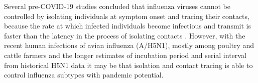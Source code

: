 \documentclass{article}
\begin{document}
Several pre-COVID-19 studies concluded that influenza viruses cannot be controlled by isolating individuals at symptom onset and tracing their contacts, because the rate at which infected individuals become infectious and transmit is faster than the latency in the process of isolating contacts \citep{fraserFactorsThatMake2004, klinkenbergEffectivenessContactTracing2006}. However, with the recent human infections of avian influenza (A/H5N1), mostly among poultry and cattle farmers \citep{gargHighlyPathogenicAvian2025} and the longer estimates of incubation period and serial interval from historical H5N1 data \citep{Ward2024.12.11.24318702} it may be that isolation and contact tracing is able to control influenza subtypes with pandemic potential. \\

\end{document}
